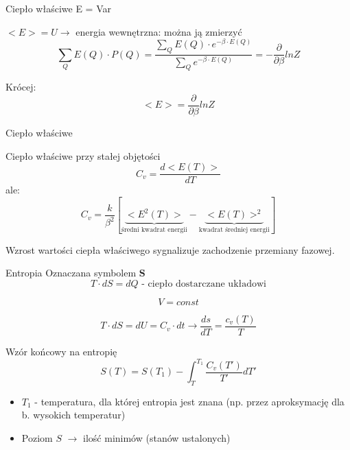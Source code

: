 	\begin{frame}{Ciepło właściwe}
		E = Var
		\begin{block}{$ <E> = U \rightarrow$ energia wewnętrzna: można ją zmierzyć}
			$$
			\sum_Q E(Q) \cdot P(Q) = \dfrac{\sum_Q E(Q) \cdot e^{-\beta\cdot E(Q)}}{\sum_Q e^{-\beta\cdot E(Q)}} = - \frac{\partial}{\partial \beta} ln Z
			$$
		\end{block}
	
		\begin{block}{Krócej:}
			$$
			<E> = \frac{\partial}{\partial \beta} ln Z
			$$
		\end{block}	
	\end{frame}
	
	\begin{frame}{Ciepło właściwe}
		\begin{block}{Ciepło właściwe przy stałej objętości}
			$$
			C_v = \frac{d<E(T)>}{dT}
			$$
			ale:
			$$
			C_v = \frac{k}{\beta^2}[\underbrace{<E^2(T)>}_{\text{średni kwadrat energii}} - \underbrace{<E(T)>^2}_{\text{kwadrat średniej energii}}]
			$$
		\end{block}		
	
	Wzrost wartości ciepła właściwego sygnalizuje zachodzenie przemiany fazowej.	
	\end{frame}

	\begin{frame}{Entropia}
		Oznaczana symbolem \textbf{S}
		$$
		T \cdot dS = dQ \text{ - ciepło dostarczane układowi}
		$$
		
		$$
		V = const
		$$
		
		$$
		T \cdot dS = dU = C_v \cdot dt \rightarrow \frac{ds}{dT} = \frac{c_v(T)}{T}
		$$
		
		\begin{block}{Wzór końcowy na entropię}
			$$
			S(T) = S(T_1) - \int_T^{T_1} \frac{C_v(T')}{T'}dT'
			$$
		\end{block}
		
		\begin{itemize}
			\item $T_1$ - temperatura, dla której entropia jest znana (np. przez aproksymację dla b. wysokich temperatur)
			\item Poziom $S$ $\rightarrow$ ilość minimów (stanów ustalonych)		
		\end{itemize}
	\end{frame}